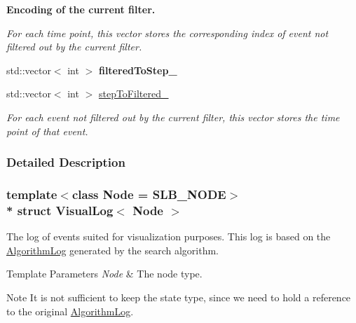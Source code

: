 \begin{Indent}{\bf Encoding of the current filter.}\par
{\em For each time point, this vector stores the corresponding index of event not filtered out by the current filter. }\begin{DoxyCompactItemize}
\item 
std\+::vector$<$ int $>$ {\bfseries filtered\+To\+Step\+\_\+}\hypertarget{structVisualLog_aecd44d2ea82486c059df4da5d276d1b0}{}\label{structVisualLog_aecd44d2ea82486c059df4da5d276d1b0}

\item 
std\+::vector$<$ int $>$ \hyperlink{structVisualLog_a61ecc91ea10b34008c823fe6dbc16718}{step\+To\+Filtered\+\_\+}\hypertarget{structVisualLog_a61ecc91ea10b34008c823fe6dbc16718}{}\label{structVisualLog_a61ecc91ea10b34008c823fe6dbc16718}

\begin{DoxyCompactList}\small\item\em For each event not filtered out by the current filter, this vector stores the time point of that event. \end{DoxyCompactList}\end{DoxyCompactItemize}
\end{Indent}


\subsubsection{Detailed Description}
\subsubsection*{template$<$class Node = S\+L\+B\+\_\+\+N\+O\+DE$>$\\*
struct Visual\+Log$<$ Node $>$}

The log of events suited for visualization purposes. This log is based on the \hyperlink{structAlgorithmLog}{Algorithm\+Log} generated by the search algorithm. 


\begin{DoxyTemplParams}{Template Parameters}
{\em Node} & The node type. \\
\hline
\end{DoxyTemplParams}
\begin{DoxyNote}{Note}
It is not sufficient to keep the state type, since we need to hold a reference to the original \hyperlink{structAlgorithmLog}{Algorithm\+Log}. 
\end{DoxyNote}


